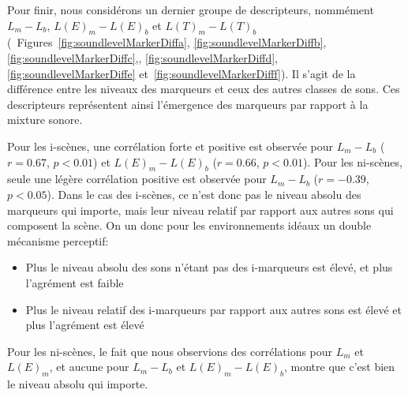 Pour finir, nous considérons un dernier groupe de descripteurs, nommément $L_m-L_b$, $L(E)_m-L(E)_b$ et $L(T)_m-L(T)_b$ (\Cf~Figures~\ref{fig:soundlevelMarkerDiffa}, \ref{fig:soundlevelMarkerDiffb}, \ref{fig:soundlevelMarkerDiffc},, \ref{fig:soundlevelMarkerDiffd}, \ref{fig:soundlevelMarkerDiffe} et~\ref{fig:soundlevelMarkerDifff}). Il s'agit de la différence entre les niveaux des marqueurs et ceux des autres classes de sons. Ces descripteurs représentent ainsi l’émergence des marqueurs par rapport à la mixture sonore. 

Pour les i-scènes, une corrélation forte et positive est observée pour $L_m-L_b$ ($r=0.67$, $p<0.01$) et $L(E)_m-L(E)_b$ ($r=0.66$, $p<0.01$). Pour les ni-scènes, seule une légère corrélation positive est observée pour $L_m-L_b$ ($r=-0.39$, $p<0.05$). Dans le cas des i-scènes, ce n'est donc pas le niveau absolu des marqueurs qui importe, mais leur niveau relatif par rapport aux autres sons qui composent la scène. On un donc pour les environnements idéaux un double mécanisme perceptif: 

\begin{itemize}
\item Plus le niveau absolu des sons n'étant pas des i-marqueurs est élevé, et plus l'agrément est faible
\item Plus le niveau relatif des i-marqueurs par rapport aux autres sons est élevé et plus l'agrément est élevé
\end{itemize}

Pour les ni-scènes, le fait que nous observions des corrélations pour $L_m$ et $L(E)_m$, et aucune pour $L_m-L_b$ et $L(E)_m-L(E)_b$, montre que c'est bien le niveau absolu qui importe.

